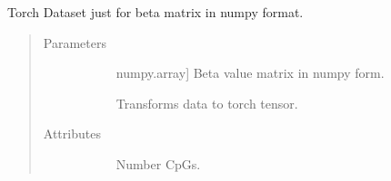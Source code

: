 \documentclass[letterpaper,10pt,english]{sphinxmanual}
\begin{document}

\begin{fulllineitems}
\label{\detokenize{index:methylnet.datasets.RawBetaArrayDataSet}}
Torch Dataset just for beta matrix in numpy format.
\begin{quote}\begin{description}
\item[{Parameters}] \leavevmode\begin{description}
\item[{}] \leavevmode{[}numpy.array{]}
Beta value matrix in numpy form.

\item[{}] \leavevmode
Transforms data to torch tensor.

\end{description}

\item[{Attributes}] \leavevmode\begin{description}
\item[{}] \leavevmode
Number CpGs.

\item[{}] \leavevmode
\item[{}] \leavevmode
\end{description}

\end{description}\end{quote}

\end{fulllineitems}

\end{document}
